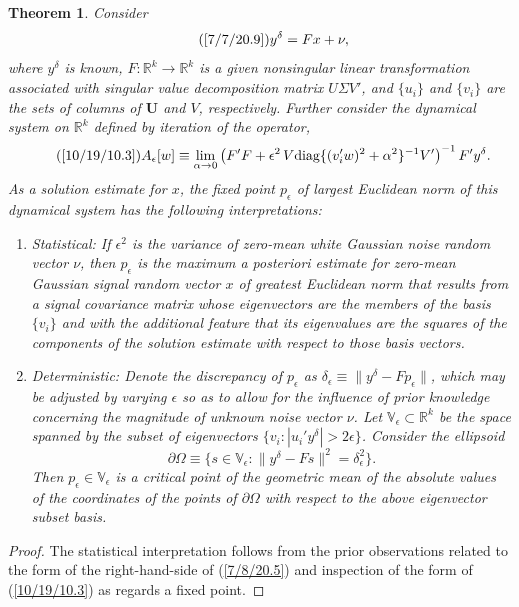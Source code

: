 \documentclass{amsart}
\numberwithin{equation}{section}
\newtheorem{theorem}{Theorem}
\theoremstyle{definition}
\numberwithin{theorem}{section}
\begin{document}
{ 
 \begin{theorem} \label{7/6/21.6} Consider \begin{equation} \tag{\ref{7/7/20.9}} y^\delta = F x +\nu, \end{equation} where $y^\delta$ is known, $F:\mathbb{R}^k\rightarrow\mathbb{R}^k$ is a given nonsingular linear transformation associated with singular value decomposition matrix $U\Sigma V'$, and $\{u_i\}$ and $\{v_i\}$ are the sets of columns of $\mathbf{U}$ and $V$, respectively.  Further consider the dynamical system on $\mathbb{R}^k$ defined by iteration of the operator, \begin{equation}\tag{\ref{10/19/10.3}} A_\epsilon[w] \equiv \lim_{\alpha\rightarrow 0}\left(F'F+\epsilon^2\, V\mbox{\rm diag}\{(v_i'w)^2 + \alpha^2\}^{-1}V' \right)^{-1} F'y^\delta. \end{equation} 
As a solution estimate for $x$, the fixed point $p_\epsilon$ of largest Euclidean norm of this dynamical system  has the following interpretations:
\begin{enumerate}\item {\rm Statistical:} If $\epsilon^2$ is the variance of zero-mean white Gaussian noise random vector $\nu$, then 
$p_\epsilon$ is the  {\rm maximum a posteriori} estimate for zero-mean Gaussian signal random vector $x$ of greatest Euclidean norm
 that results from a signal covariance matrix  whose eigenvectors are the members of the basis $\{v_i\}$ and with the additional feature that its eigenvalues are the squares of the components of the solution estimate with respect to those basis vectors.   
 \item  
{\rm Deterministic:} Denote the discrepancy of $p_\epsilon$ as $\delta_\epsilon \equiv \| y^\delta - Fp_\epsilon\|$, which may be adjusted by varying $\epsilon$ so as to allow for the influence of prior knowledge concerning the magnitude of unknown noise vector $\nu$.  Let $\mathbb{V}_\epsilon \subset \mathbb{R}^k$ be the space spanned by the subset of eigenvectors $\{v_i: |u_i'y^\delta| > 2\epsilon \}$.  
 Consider the ellipsoid \[ \partial\Omega \equiv \{ s\in \mathbb{V}_\epsilon: \| y^\delta - Fs\|^2 = \delta_\epsilon^2 \}.\]   Then $p_\epsilon\in \mathbb{V}_\epsilon$ is a critical point of the geometric mean of the absolute values of the coordinates of the points of $\partial\Omega$ with respect to the above eigenvector subset basis.
\end{enumerate}
\end{theorem}

\begin{proof}
The statistical interpretation follows from the prior observations related to the form of the right-hand-side of (\ref{7/8/20.5}) and inspection of the form of (\ref{10/19/10.3}) as regards a fixed point.


\end{proof}}
\end{document}
